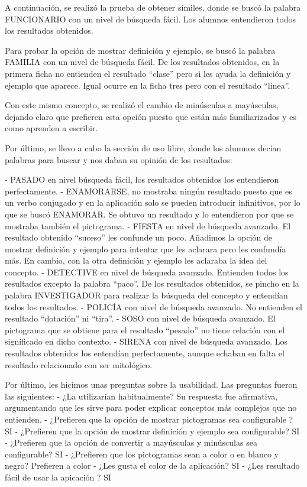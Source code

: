 A continuación, se realizó la prueba de obtener símiles, donde se buscó la palabra FUNCIONARIO con un nivel de búsqueda fácil. Los alumnos entendieron todos los resultados obtenidos.

Para probar la opción de mostrar definición y ejemplo, se buscó la palabra FAMILIA con un nivel de búsqueda fácil. De los resultados obtenidos, en la primera ficha no entienden el resultado ``clase'' pero si les ayuda la definición y ejemplo que aparece. Igual ocurre en la ficha tres pero con el resultado ``línea''.

Con este mismo concepto, se realizó el cambio de minúsculas a mayúsculas, dejando claro que prefieren esta opción puesto que están más familiarizados y es como aprenden a escribir.

Por último, se llevo a cabo la sección de uso libre, donde los alumnos decían palabras para buscar y nos daban su opinión de los resultados:

- PASADO en nivel búsqueda fácil, los resultados obtenidos los entendieron perfectamente.
- ENAMORARSE, no mostraba ningún resultado puesto que es un verbo conjugado y en la aplicación solo se pueden introducir infinitivos, por lo que se buscó ENAMORAR. Se obtuvo un resultado y lo entendieron por que se mostraba también el pictograma.
- FIESTA en nivel de búsqueda avanzado. El resultado obtenido ``suceso'' les confunde un poco. Añadimos la opción de mostrar definición y ejemplo para intentar que les aclarara pero les confundía más. En cambio, con la otra definición y ejemplo les aclaraba la idea del concepto.
- DETECTIVE en nivel de búsqueda avanzado. Entienden todos los resultados excepto la palabra ``paco''.
De los resultados obtenidos, se pincho en la palabra INVESTIGADOR para realizar la búsqueda del concepto y entendían todos los resultados.
- POLICÍA con nivel de búsqueda avanzado. No entienden el resultado ``dotación'' ni ``tira''.
- SOSO con nivel de búsqueda avanzado. El pictograma que se obtiene para el resultado ``pesado'' no tiene relación con el significado en dicho contexto.
- SIRENA con nivel de búsqueda avanzado. Los resultados obtenidos los entendían perfectamente, aunque echaban en falta el resultado relacionado con ser mitológico.


Por último, les hicimos unas preguntas sobre la usabilidad. Las preguntas fueron las siguientes:
- ¿La utilizarían habitualmente?
Su respuesta fue afirmativa, argumentando que les sirve para poder explicar conceptos más complejos que no entienden.
- ¿Prefieren que la opción de mostrar pictogramas sea configurable ?
SI
- ¿Prefieren que la opción de mostrar definición y ejemplo sea configurable?
SI
- ¿Prefieren que la opción de convertir a mayúsculas y minúsculas sea configurable?
SI
- ¿Prefieren que los pictogramas sean a color o en blanco y negro?
Prefieren a color
- ¿Les gusta el color de la aplicación?
SI
- ¿Les resultado fácil de usar la apicación ?
SI

